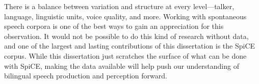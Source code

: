 There is a balance between variation and structure at every level---talker, language, linguistic units, voice quality, and more. Working with spontaneous speech corpora is one of the best ways to gain an appreciation for this observation. It would not be possible to do this kind of research without data, and one of the largest and lasting contributions of this dissertation is the SpiCE corpus. While this dissertation just scratches the surface of what can be done with SpiCE, making the data available will help push our understanding of bilingual speech production and perception forward. 

\endinput %
